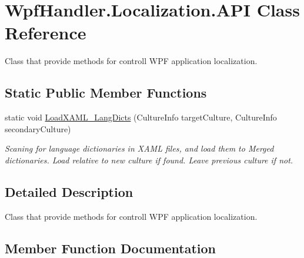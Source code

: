 \hypertarget{class_wpf_handler_1_1_localization_1_1_a_p_i}{}\section{Wpf\+Handler.\+Localization.\+A\+PI Class Reference}
\label{class_wpf_handler_1_1_localization_1_1_a_p_i}


Class that provide methods for controll W\+PF application localization.  


\subsection*{Static Public Member Functions}
\begin{DoxyCompactItemize}
\item 
static void \mbox{\hyperlink{class_wpf_handler_1_1_localization_1_1_a_p_i_a731d709472e9bf3fff2e55145f7a1c4c}{Load\+X\+A\+M\+L\+\_\+\+Lang\+Dicts}} (Culture\+Info target\+Culture, Culture\+Info secondary\+Culture)
\begin{DoxyCompactList}\small\item\em Scaning for language dictionaries in X\+A\+ML files, and load them to Merged dictionaries. Load relative to new culture if found. Leave previous culture if not. \end{DoxyCompactList}\end{DoxyCompactItemize}


\subsection{Detailed Description}
Class that provide methods for controll W\+PF application localization. 



\subsection{Member Function Documentation}
\mbox{\label{class_wpf_handler_1_1_localization_1_1_a_p_i_a731d709472e9bf3fff2e55145f7a1c4c}} 
